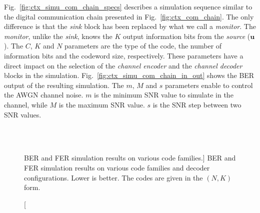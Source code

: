 Fig.~\ref{fig:ctx_simu_com_chain_specs} describes a simulation sequence similar
to the digital communication chain presented in Fig.~\ref{fig:ctx_com_chain}.
The only difference is that the \emph{sink} block has been replaced by what we
call a \emph{monitor}. The \emph{monitor}, unlike the \emph{sink}, knows the $K$
output information bits from the \emph{source} ($\bm{u}$). The $C$, $K$ and $N$
parameters are the type of the code, the number of information bits and the
codeword size, respectively. These parameters have a direct impact on the
selection of the \emph{channel encoder} and the \emph{channel decoder} blocks
in the simulation. Fig.~\ref{fig:ctx_simu_com_chain_in_out} shows the BER output
of the resulting simulation. The $m$, $M$ and $s$ parameters enable to control
the AWGN channel noise. $m$ is the minimum SNR value to simulate in the channel,
while $M$ is the maximum SNR value. $s$ is the SNR step between two SNR values.

\begin{figure}[htp]
  \centering
     \quad{}
    \\
    \quad{}
      \\
   \quad{}
  \caption
    [BER and FER simulation results on various code families.]
    {BER and FER simulation results on various code families and decoder
    configurations. Lower is better. The codes are given in the $(N,K)$ form.}
  \label{fig:ctx_bfer}
\end{figure}

